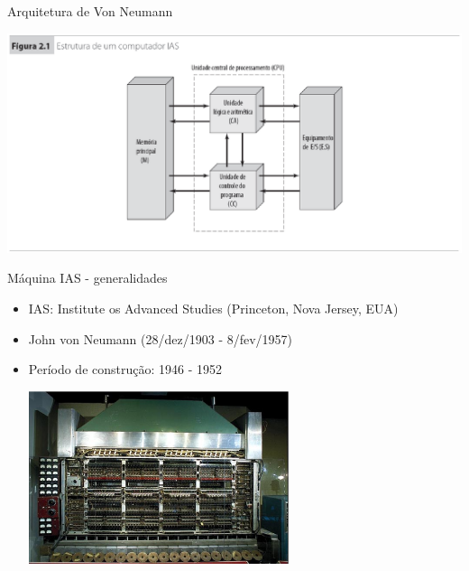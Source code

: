 \begin{slide}[toc=]{Arquitetura de Von Neumann}
\begin{center}
   \includegraphics[width=1.0\textwidth]{figs/vneumann} 
\end{center}
\end{slide}

\begin{slide}[toc=]{Máquina IAS - generalidades}
\begin{itemize}
   \item IAS: Institute os Advanced Studies (Princeton, Nova Jersey, EUA)
   \item John von Neumann (28/dez/1903 - 8/fev/1957)
   \item Período de construção: 1946 - 1952
   \begin{center}
      \includegraphics[width=0.60\textwidth]{figs/iasl} 
   \end{center}
\end{itemize}
\end{slide}

